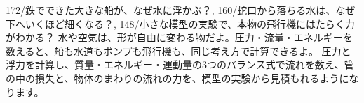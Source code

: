 %
  {172/{鉄でできた大きな船が、なぜ水に浮かぶ？},
   160/{蛇口から落ちる水は、なぜ下へいくほど細くなる？},
   148/{小さな模型の実験で、本物の飛行機にはたらく力がわかる？}}%
  {水や空気は、形が自由に変わる物だよ。圧力・流量・エネルギーを数えると、船も水道もポンプも飛行機も、同じ考え方で計算できるよ。}%
  {圧力と浮力を計算し、質量・エネルギー・運動量の3つのバランス式で流れを数え、管の中の損失と、物体のまわりの流れの力を、模型の実験から見積もれるようになります。}


